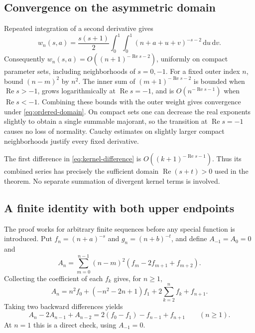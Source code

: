 \documentclass[11pt,a4paper]{article}
\numberwithin{equation}{section}
\theoremstyle{definition}
\theoremstyle{remark}
\newcommand{\dd}{\,\mathrm d}
\newcommand{\Rea}{\operatorname{Re}}
\begin{document}
\subsection{Convergence on the asymmetric domain}

Repeated integration of a second derivative gives
\begin{equation}\label{eq:second-difference-integral}
 w_n(s,a)=\frac{s(s+1)}2\int_0^1\int_0^1
               (n+a+u+v)^{-s-2}\dd u\dd v.
\end{equation}
Consequently $w_n(s,a)=O((n+1)^{-\Rea s-2})$, uniformly on compact
parameter sets, including neighborhoods of $s=0,-1$.
For a fixed outer index $n$, bound $(n-m)^2$ by $n^2$.
The inner sum of $(m+1)^{-\Rea s-2}$ is bounded when
$\Rea s>-1$, grows logarithmically at $\Rea s=-1$, and is
$O(n^{-\Rea s-1})$ when $\Rea s<-1$. Combining these bounds with
the outer weight gives convergence under \eqref{eq:ordered-domain}.
On compact sets one can decrease the real exponents slightly to
obtain a single summable majorant, so the transition at $\Rea s=-1$
causes no loss of normality. Cauchy estimates on slightly larger
compact neighborhoods justify every fixed derivative.

The first difference in \eqref{eq:kernel-difference} is
$O((k+1)^{-\Rea s-1})$. Thus its combined series has precisely the
sufficient domain $\Rea(s+t)>0$ used in the theorem. No separate
summation of divergent kernel terms is involved.

\subsection{A finite identity with both upper endpoints}

The proof works for arbitrary finite sequences before any special
function is introduced. Put $f_n=(n+a)^{-s}$ and $g_n=(n+b)^{-t}$,
and define $A_{-1}=A_0=0$ and
\begin{equation}\label{eq:A-n}
 A_n=\sum_{m=0}^{n-1}(n-m)^2(f_m-2f_{m+1}+f_{m+2}).
\end{equation}
Collecting the coefficient of each $f_k$ gives, for $n\ge1$,
\begin{equation}\label{eq:A-explicit}
 A_n=n^2f_0+(-n^2-2n+1)f_1
                  +2\sum_{k=2}^{n}f_k+f_{n+1}.
\end{equation}
Taking two backward differences yields
\begin{equation}\label{eq:A-difference}
 A_n-2A_{n-1}+A_{n-2}
          =2(f_0-f_1)-f_{n-1}+f_{n+1}\qquad(n\ge1).
\end{equation}
At $n=1$ this is a direct check, using $A_{-1}=0$.
\end{document}
